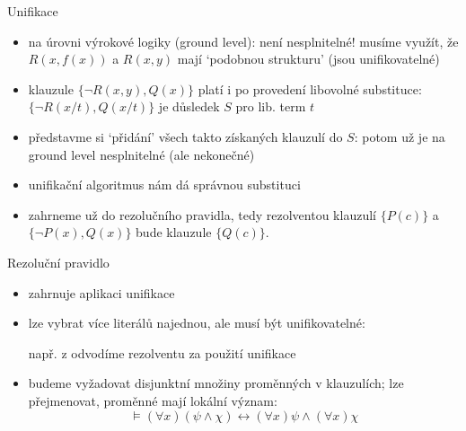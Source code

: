 \documentclass{beamer}
\begin{document}
\begin{frame}{Unifikace}


    \begin{itemize}
        \item na \alert{úrovni výrokové logiky} (\alert{ground level}):
        není nesplnitelné! musíme využít, že $R(x,f(x))$ a $R(x,y)$ mají `podobnou strukturu' (jsou \alert{unifikovatelné})
        \item klauzule $\{\neg R(x,y),Q(x)\}$ platí i po provedení libovolné substituce: \alert{$\{\neg R(x/t),Q(x/t)\}$} je důsledek $S$ pro lib. term $t$
        \item představme si `přidání' všech takto získaných klauzulí do $S$: potom už je na ground level nesplnitelné (ale nekonečné)
        \item \alert{unifikační algoritmus} nám dá správnou substituci 
        \item zahrneme už do \alert{rezolučního pravidla}, tedy \alert{rezolventou} klauzulí $\{P(c)\}$ a $\{\neg P(x),Q(x)\}$ bude klauzule $\{Q(c)\}$.
    \end{itemize}
 
\end{frame}

\begin{frame}{Rezoluční pravidlo}
    
    \begin{itemize}

        \item zahrnuje aplikaci unifikace
        \item lze vybrat \alert{více literálů najednou}, ale musí být unifikovatelné:
        
        \bigskip

        např. z  odvodíme rezolventu  za použití \alert{unifikace} 

        \medskip


        \bigskip

        \item budeme vyžadovat disjunktní množiny proměnných v klauzulích; lze přejmenovat, proměnné mají \alert{lokální význam}:
        $$
        \models(\forall x)(\psi \land \chi) \leftrightarrow (\forall x)\psi \land (\forall x)\chi
        $$
        
    \end{itemize}

\end{frame}
\end{document}
